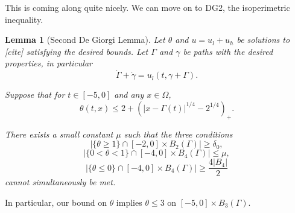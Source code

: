 \documentclass[11pt]{amsart}
\newtheorem{lemma}[theorem]{Lemma}
\theoremstyle{remark}
\theoremstyle{definition}
\newcommand{\paren}[1]{\left( #1 \right)}
\newcommand{\abs}[1]{\left\lvert #1 \right\rvert}
\newcommand{\ulow}{u_l}
\newcommand{\uhigh}{u_h}
\begin{document}
This is coming along quite nicely.  We can move on to DG2, the isoperimetric inequality.  

\begin{lemma}[Second De Giorgi Lemma] \label{thm:DG2}
Let $\theta$ and $u = \ulow + \uhigh$ be solutions to [cite] satisfying the desired bounds.  Let $\Gamma$ and $\gamma$ be paths with the desired properties, in particular
\[ \dot{\Gamma} +\dot{\gamma} = \ulow(t,\gamma + \Gamma). \]

Suppose that for $t \in [-5,0]$ and any $x \in \Omega$,
\[ \theta(t,x) \leq 2 + \paren{|x-\Gamma(t)|^{1/4}-2^{1/4}}_+. \]

There exists a small constant $\mu$ such that the three conditions
\[ \abs{\{\theta \geq 1\} \cap [-2,0]\times B_2(\Gamma)} \geq \delta_0, \]
\[ \abs{\{0 < \theta < 1\} \cap [-4,0]\times B_4(\Gamma)} \leq \mu, \]
\[ \abs{\{\theta \leq 0\} \cap [-4,0]\times B_4(\Gamma)} \geq \frac{4 |B_4|}{2} \]
cannot simultaneously be met.  
\end{lemma}

In particular, our bound on $\theta$ implies $\theta \leq 3$ on $[-5,0] \times B_3(\Gamma)$.  
\end{document}
